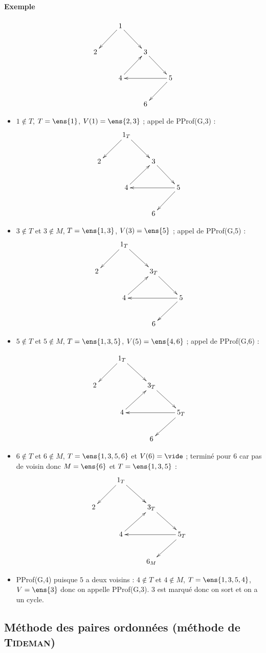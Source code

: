 \documentclass{mybourbaki}
\begin{document}
\paragraph{Exemple}
\[\xymatrix{ 
& 1 \ar[ld]\ar[rd]\\
2 & & 3\ar[rd]\\
& 4 \ar[ur] && 5 \ar[ll]\ar[ld]\\
& & 6
}\]
\begin{itemize}
\item $1\not\in T$, $T = \ens{1}$, $V(1) = \ens{2,3}$ ; appel de PProf(G,3) :
\[\xymatrix{ 
& 1_T \ar[ld]\ar[rd]\\
2 & & 3\ar[rd]\\
& 4 \ar[ur] && 5 \ar[ll]\ar[ld]\\
& & 6
}\]
\item $3\not\in T$ et $3\not\in M$, $T = \ens{1,3}$, $V(3) = \ens{5}$ ; appel de PProf(G,5) :
\[\xymatrix{ 
& 1_T \ar[ld]\ar[rd]\\
2 & & 3_T\ar[rd]\\
& 4 \ar[ur] && 5 \ar[ll]\ar[ld]\\
& & 6
}\]
\item $5\not\in T$ et $5\not\in M$, $T = \ens{1,3,5}$, $V(5) = \ens{4,6}$ ; appel de PProf(G,6) :

\[\xymatrix{ 
& 1_T \ar[ld]\ar[rd]\\
2 & & 3_T\ar[rd]\\
& 4 \ar[ur] && 5_T \ar[ll]\ar[ld]\\
& & 6
}\]
\item $6\not\in T$ et $6\not\in M$, $T = \ens{1,3,5,6}$ et $V(6) = \vide$ ; terminé pour $6$ car pas de voisin donc $M = \ens{6}$ et $T=\ens{1,3,5}$ :
\[\xymatrix{ 
& 1_T \ar[ld]\ar[rd]\\
2 & & 3_T\ar[rd]\\
& 4 \ar[ur] && 5_T \ar[ll]\ar[ld]\\
& & 6_M
}\]

\item PProf(G,4) puisque $5$ a deux voisins :
$4\not\in T$ et $4\not\in M$, $T = \ens{1,3,5,4}$, $V = \ens{3}$ donc on appelle PProf(G,3). 3  est marqué donc on sort et on a un cycle.
\end{itemize}

\subsection{Méthode des paires ordonnées (méthode de \textsc{Tideman})}
\end{document}
